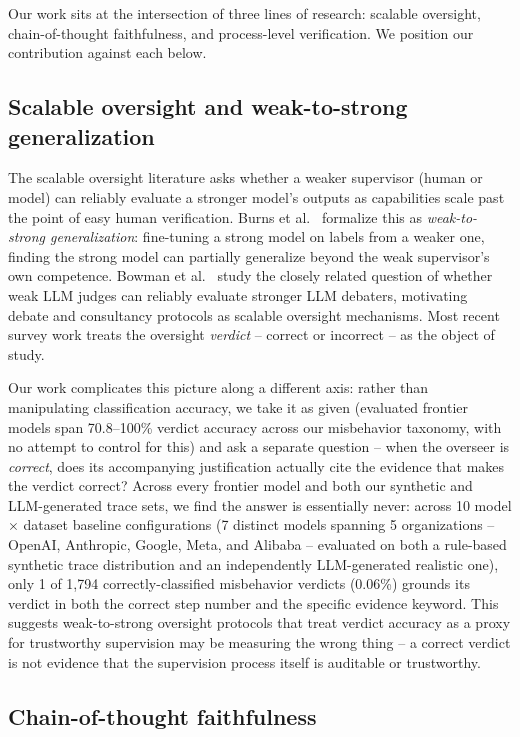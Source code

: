 \documentclass[conference]{IEEEtran}
\begin{document}
Our work sits at the intersection of three lines of research: scalable
oversight, chain-of-thought faithfulness, and process-level verification. We
position our contribution against each below.

\subsection{Scalable oversight and weak-to-strong generalization}

The scalable oversight literature asks whether a weaker supervisor (human or
model) can reliably evaluate a stronger model's outputs as capabilities
scale past the point of easy human verification. Burns et al.~\cite{burns2023weak}
formalize this as \emph{weak-to-strong generalization}: fine-tuning a strong
model on labels from a weaker one, finding the strong model can partially
generalize beyond the weak supervisor's own competence. Bowman et
al.~\cite{bowman2022measuring} study the closely related question of
whether weak LLM judges can reliably evaluate stronger LLM debaters,
motivating debate and consultancy protocols as scalable oversight
mechanisms. Most recent survey work treats the oversight \emph{verdict} --
correct or incorrect -- as the object of study.

Our work complicates this picture along a different axis: rather than
manipulating classification accuracy, we take it as given (evaluated
frontier models span 70.8--100\% verdict accuracy across our misbehavior
taxonomy, with no attempt to control for this) and ask a separate question
-- when the overseer is \emph{correct}, does its
accompanying justification actually cite the evidence that makes the
verdict correct? Across every frontier model and both our synthetic and
LLM-generated trace sets, we find the answer is essentially never: across
10 model $\times$ dataset baseline configurations (7 distinct models
spanning 5 organizations -- OpenAI, Anthropic, Google, Meta, and Alibaba --
evaluated on both a rule-based synthetic trace distribution and an
independently LLM-generated realistic
one), only 1 of 1{,}794 correctly-classified misbehavior verdicts (0.06\%)
grounds its verdict in both the correct step number and the specific
evidence keyword. This suggests weak-to-strong oversight protocols that
treat verdict accuracy as a proxy for trustworthy supervision may be
measuring the wrong thing -- a correct verdict is not evidence that the
supervision process itself is auditable or trustworthy.

\subsection{Chain-of-thought faithfulness}
\end{document}
